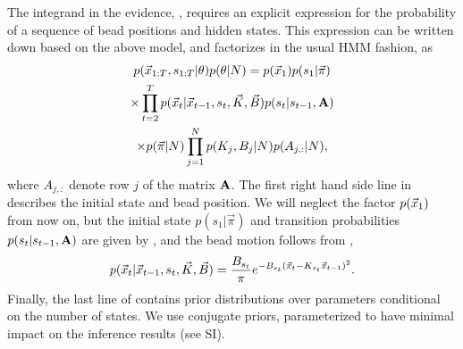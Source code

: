 The integrand in the evidence, , requires an
explicit expression for the probability of a sequence of bead
positions and hidden states. This expression can be written down based
on the above model, and factorizes in the usual HMM fashion, as
\begin{multline}\label{eq:evidencintegrand}
 p(\x_{1:T},s_{1:T}|\theta)p(\theta|N)%
=
p(\x_1)p(s_1|\vec{\pi})\\
\times
\prod_{t=2}^{T}p(\x_t|\x_{t-1},s_t,\vec{K},\vec{B})p(s_t|s_{t-1},\matris{A})\\
\times
p(\vec{\pi}|N)
\prod_{j=1}^Np(K_j,B_j|N)p(A_{j,:}|N),
\end{multline}
where $A_{j,:}$ denote row $j$ of the matrix $\mathbf{A}$.  The first
right hand side line in  describes the initial
state and bead position. We will neglect the factor $p(\vec{x}_1)$ from now
on, but the initial state $p(s_1|\vec\pi)$ and transition
probabilities $p(s_t|s_{t-1},\mathbf{A})$ are given by
, and the bead motion follows from ,
\begin{equation}
 p(\vec{x}_t|\vec{x}_{t-1},s_t,\vec{K},\vec{B})
 =\frac{B_{s_t}}{\pi}
 e^{-B_{s_t}(\vec{x}_t-K_{s_t}\vec{x}_{t-1})^2}.
\end{equation}
Finally, the last line of  contains prior
distributions over parameters conditional on the number of states. We
use conjugate priors, parameterized to have minimal impact on the
inference results (see SI).




